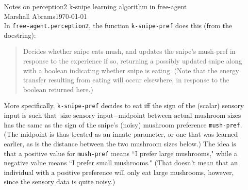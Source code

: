 \documentclass[12pt]{article}
\begin{document}
{\large Notes on perception2 k-snipe learning algorithm in free-agent}\\
Marshall Abrams\hfill\today\\

In {\tt free-agent.perception2}, the function {\tt k-snipe-pref}
does this (from the docstring):
\begin{quote}\vspace{-2ex}
    Decides whether snipe eats mush, and updates the snipe's mush-pref
    in  response to the experience if so, returning a possibly updated
    snipe  along with a boolean indicating whether snipe is eating. 
    (Note that  the energy transfer resulting from eating will occur
    elsewhere, in  response to the boolean returned here.)
\end{quote}\vspace{-2ex}
More specifically, {\tt k-snipe-pref} decides to eat iff the sign of
the (scalar) sensory input is such that $\mbox{size sensory input} -
\mbox{midpoint between actual mushroom sizes}$ has the same as the
sign of the snipe's (noisy) mushroom preference {\tt mush-pref}.
(The midpoint is thus treated as an innate parameter, or one that was
learned  earlier, as is the distance between the two mushroom sizes
below.)  The idea is that a positive value for {\tt mush-pref} means
``I prefer large mushrooms," while a negative value means ``I prefer
small mushrooms." (That doesn't mean that an individual with a
positive preference will only eat large mushrooms, however, since the
sensory data is quite noisy.)
\end{document}
